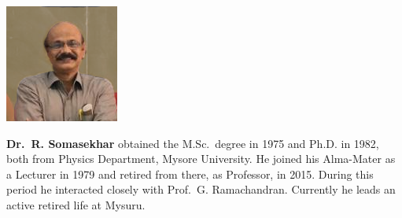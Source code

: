\centerline{\includegraphics[scale=.8]{authorsphotos/Somasekhar1.png}}
\bigskip

\noindent
\textbf{Dr.\ R. Somasekhar} obtained the M.Sc.\ degree in 1975 and Ph.D. in 1982, both from Physics Department, Mysore University. 
He joined his Alma-Mater as a Lecturer in 1979 and retired from there, as Professor, in 2015. During this period he interacted closely with 
Prof.\ G. Ramachandran. Currently he leads an active retired life at Mysuru.
